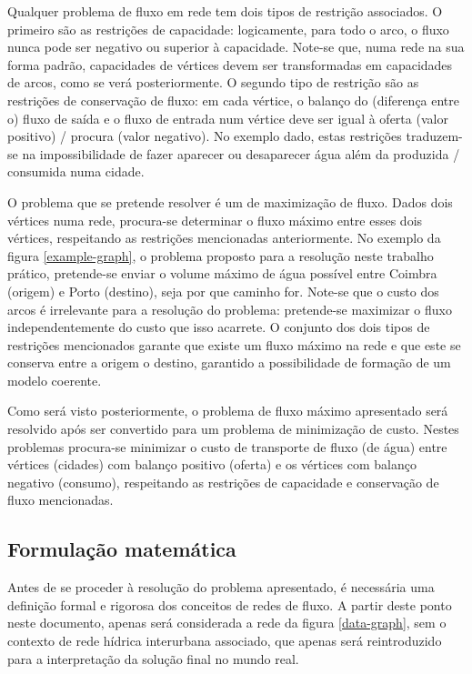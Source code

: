 \documentclass[12pt, a4paper, titlepage]{article}
\begin{document}
Qualquer problema de fluxo em rede tem dois tipos de restrição associados. O primeiro são as
restrições de capacidade: logicamente, para todo o arco, o fluxo nunca pode ser negativo ou superior
à capacidade. Note-se que, numa rede na sua forma padrão, capacidades de vértices devem ser
transformadas em capacidades de arcos, como se verá posteriormente. O segundo tipo de restrição são
as restrições de conservação de fluxo: em cada vértice, o balanço do (diferença entre o) fluxo de
saída e o fluxo de entrada num vértice deve ser igual à oferta (valor positivo) / procura (valor
negativo). No exemplo dado, estas restrições traduzem-se na impossibilidade de fazer aparecer ou
desaparecer água além da produzida / consumida numa cidade.

O problema que se pretende resolver é um de maximização de fluxo. Dados dois vértices numa rede,
procura-se determinar o fluxo máximo entre esses dois vértices, respeitando as restrições
mencionadas anteriormente. No exemplo da figura \ref{example-graph}, o problema proposto para a
resolução neste trabalho prático, pretende-se enviar o volume máximo de água possível entre Coimbra
(origem) e Porto (destino), seja por que caminho for. Note-se que o custo dos arcos é irrelevante
para a resolução do problema: pretende-se maximizar o fluxo independentemente do custo que isso
acarrete. O conjunto dos dois tipos de restrições mencionados garante que existe um fluxo máximo
na rede e que este se conserva entre a origem o destino, garantido a possibilidade de formação de um
modelo coerente.

Como será visto posteriormente, o problema de fluxo máximo apresentado será resolvido após ser
convertido para um problema de minimização de custo. Nestes problemas procura-se minimizar o custo
de transporte de fluxo (de água) entre vértices (cidades) com balanço positivo (oferta) e os
vértices com balanço negativo (consumo), respeitando as restrições de capacidade e conservação de
fluxo mencionadas.

\subsection{Formulação matemática}

Antes de se proceder à resolução do problema apresentado, é necessária uma definição formal e
rigorosa dos conceitos de redes de fluxo. A partir deste ponto neste documento, apenas será
considerada a rede da figura \ref{data-graph}, sem o contexto de rede hídrica interurbana associado,
que apenas será reintroduzido para a interpretação da solução final no mundo real.
\end{document}
